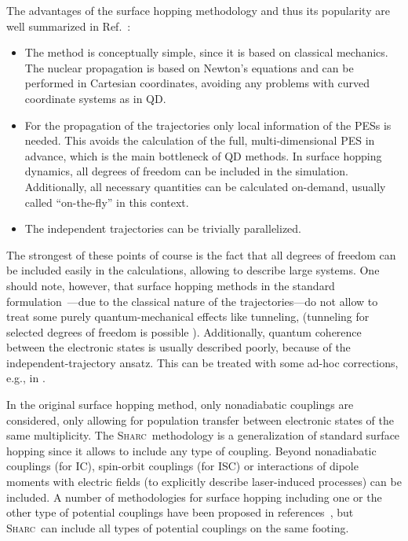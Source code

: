 \documentclass[a4paper,10pt,DIV=15,openany,twoside=false]{scrbook}
\newcommand{\sharc}{\textsc{Sharc}}
\begin{document}
The advantages of the surface hopping methodology and thus its popularity are well summarized in Ref.~\cite{Barbatti2011WCMS}:
\begin{itemize}
  \item The method is conceptually simple, since it is based on classical mechanics. The nuclear propagation is based on Newton's equations and can be performed in Cartesian coordinates, avoiding any problems with curved coordinate systems as in QD.
  \item For the propagation of the trajectories only local information of the PESs is needed. This avoids the calculation of the full, multi-dimensional PES in advance, which is the main bottleneck of QD methods. In surface hopping dynamics, all degrees of freedom can be included in the simulation. Additionally, all necessary quantities can be calculated on-demand, usually called ``on-the-fly'' in this context.
  \item The independent trajectories can be trivially parallelized.
\end{itemize}
The strongest of these points of course is the fact that all degrees of freedom can be included easily in the calculations, allowing to describe large systems.
One should note, however, that surface hopping methods in the standard formulation~\cite{Tully1971JCP, Tully1990JCP}---due to  the classical nature of the trajectories---do not allow to treat some purely quantum-mechanical effects like tunneling, (tunneling for selected degrees of freedom is possible \cite{Hammes-Schiffer1994JCP}). Additionally, quantum coherence between the electronic states is usually described poorly, because of the independent-trajectory ansatz. This can be treated with some ad-hoc corrections, e.g., in \cite{Granucci2007JCP}.

In the original surface hopping method, only nonadiabatic couplings are considered, only allowing for population transfer between electronic states of the same multiplicity. 
The \sharc\ methodology is a generalization of standard surface hopping since it allows to include any type of coupling. Beyond nonadiabatic couplings (for IC), spin-orbit couplings (for ISC) or interactions of dipole moments with electric fields (to explicitly describe laser-induced processes) can be included.
A number of methodologies for surface hopping including one or the other type of potential couplings have been proposed in references~\cite{Thachuk1996JCP,Maiti2004JPCA,Jones2008JPCA,Mitric2009PRA,Granucci2012JCP,Curchod2013C,Cui2014JCP}, but \sharc\ can include all types of potential couplings on the same footing. 
\end{document}
